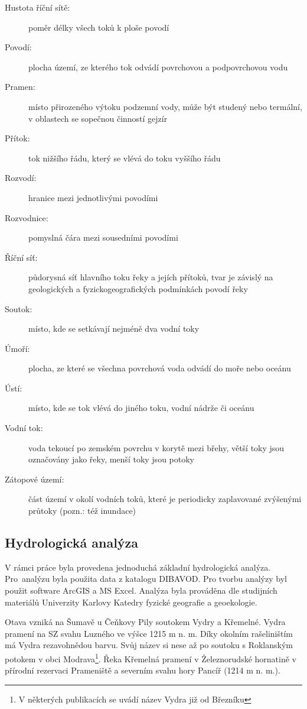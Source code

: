 \documentclass[thesis=M,czech]{FITthesis}[2012/06/26]
\begin{document}
\begin{description}
\item[Hustota říční sítě:] poměr délky všech toků k ploše povodí
\item[Povodí:] plocha území, ze kterého tok odvádí povrchovou a podpovrchovou vodu
\item[Pramen:] místo přirozeného výtoku podzemní vody, může být studený nebo termální, v oblastech se sopečnou činností gejzír
\item[Přítok:] tok nižšího řádu, který se vlévá do toku vyššího řádu
\item[Rozvodí:] hranice mezi jednotlivými povodími
\item[Rozvodnice:] pomyslná čára mezi sousedními povodími
\item[Říční síť:] půdorysná síť hlavního toku řeky a jejích přítoků, tvar je závislý na geologických a fyzickogeografických podmínkách povodí řeky
\item[Soutok:] místo, kde se setkávají nejméně dva vodní toky
\item[Úmoří:] plocha, ze které se všechna povrchová voda odvádí do moře nebo oceánu
\item[Ústí:] místo, kde se tok vlévá do jiného toku, vodní nádrže či oceánu
\item[Vodní tok:] voda tekoucí po zemském povrchu v korytě mezi břehy, větší toky jsou označovány jako řeky, menší toky jsou potoky
\item[Zátopové území:] část území v okolí vodních toků, které je periodicky zaplavované zvýšenými průtoky (pozn.: též inundace)
\end{description}



\subsection{Hydrologická analýza}
V rámci práce byla provedena jednoduchá základní hydrologická analýza. Pro~analýzu byla použita data z katalogu DIBAVOD. Pro tvorbu analýzy byl použit software ArcGIS a MS Excel. Analýza byla prováděna dle studijních materiálů Univerzity Karlovy Katedry fyzické geografie a geoekologie. \cite{UK}

Otava vzniká na Šumavě u Čeňkovy Pily soutokem Vydry a Křemelné. Vydra pramení na SZ svahu Luzného ve výšce 1215 m n. m. Díky okolním rašeliništím má Vydra rezavohnědou barvu. Svůj název si nese až po soutoku s Roklanským potokem v obci Modrava\footnote{V některých publikacích se uvádí název Vydra již od Březníku}. Řeka Křemelná pramení v Železnorudské hornatině v přírodní rezervaci Prameniště a severním svahu hory Pancíř (1214 m n. m.). \cite{SMOOS}
\end{document}
